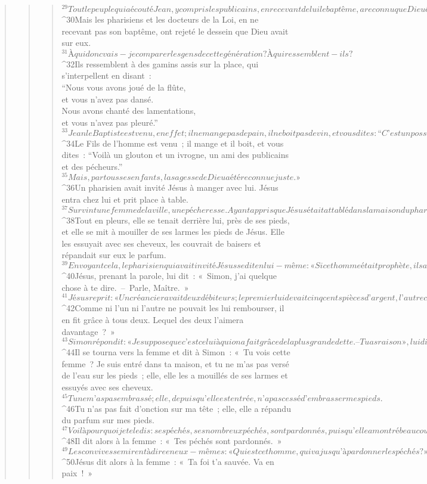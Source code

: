 \begin{verse}
\begin{verse}
\begin{verse}
${}^{29}Tout le peuple qui a écouté Jean, y compris les publicains, en recevant de lui le baptême, a reconnu que Dieu était juste. 
${}^{30}Mais les pharisiens et les docteurs de la Loi, en ne recevant pas son baptême, ont rejeté le dessein que Dieu avait sur eux.
${}^{31}À qui donc vais-je comparer les gens de cette génération ? À qui ressemblent-ils ? 
${}^{32}Ils ressemblent à des gamins assis sur la place, qui s’interpellent en disant :
        \\“Nous vous avons joué de la flûte,
        \\et vous n’avez pas dansé.
        \\Nous avons chanté des lamentations,
        \\et vous n’avez pas pleuré.”
${}^{33}Jean le Baptiste est venu, en effet ; il ne mange pas de pain, il ne boit pas de vin, et vous dites : “C’est un possédé !” 
${}^{34}Le Fils de l’homme est venu ; il mange et il boit, et vous dites : “Voilà un glouton et un ivrogne, un ami des publicains et des pécheurs.” 
${}^{35}Mais, par tous ses enfants, la sagesse de Dieu a été reconnue juste. »
${}^{36}Un pharisien avait invité Jésus à manger avec lui. Jésus entra chez lui et prit place à table. 
${}^{37}Survint une femme de la ville, une pécheresse. Ayant appris que Jésus était attablé dans la maison du pharisien, elle avait apporté un flacon d’albâtre contenant un parfum. 
${}^{38}Tout en pleurs, elle se tenait derrière lui, près de ses pieds, et elle se mit à mouiller de ses larmes les pieds de Jésus. Elle les essuyait avec ses cheveux, les couvrait de baisers et répandait sur eux le parfum. 
${}^{39}En voyant cela, le pharisien qui avait invité Jésus se dit en lui-même : « Si cet homme était prophète, il saurait qui est cette femme qui le touche, et ce qu’elle est : une pécheresse. » 
${}^{40}Jésus, prenant la parole, lui dit : « Simon, j’ai quelque chose à te dire. – Parle, Maître. » 
${}^{41}Jésus reprit : « Un créancier avait deux débiteurs ; le premier lui devait cinq cents pièces d’argent, l’autre cinquante. 
${}^{42}Comme ni l’un ni l’autre ne pouvait les lui rembourser, il en fit grâce à tous deux. Lequel des deux l’aimera davantage ? » 
${}^{43}Simon répondit : « Je suppose que c’est celui à qui on a fait grâce de la plus grande dette. – Tu as raison », lui dit Jésus. 
${}^{44}Il se tourna vers la femme et dit à Simon : « Tu vois cette femme ? Je suis entré dans ta maison, et tu ne m’as pas versé de l’eau sur les pieds ; elle, elle les a mouillés de ses larmes et essuyés avec ses cheveux. 
${}^{45}Tu ne m’as pas embrassé ; elle, depuis qu’elle est entrée, n’a pas cessé d’embrasser mes pieds. 
${}^{46}Tu n’as pas fait d’onction sur ma tête ; elle, elle a répandu du parfum sur mes pieds. 
${}^{47}Voilà pourquoi je te le dis : ses péchés, ses nombreux péchés, sont pardonnés, puisqu’elle a montré beaucoup d’amour. Mais celui à qui on pardonne peu montre peu d’amour. » 
${}^{48}Il dit alors à la femme : « Tes péchés sont pardonnés. » 
${}^{49}Les convives se mirent à dire en eux-mêmes : « Qui est cet homme, qui va jusqu’à pardonner les péchés ? » 
${}^{50}Jésus dit alors à la femme : « Ta foi t’a sauvée. Va en paix ! »
      

\end{verse}
\end{verse}
\end{verse}
